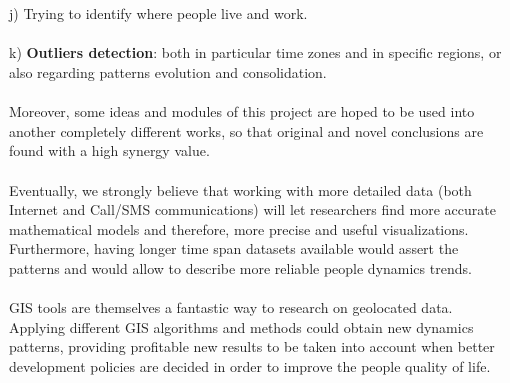 \\
\\
j) Trying to identify where people live and work.
\\
\\
k) {\bf Outliers detection}: both in particular time zones and in specific regions, or also regarding patterns evolution and consolidation.
\\
\\
Moreover, some ideas and modules of this project are hoped to be used into another completely different works, so that original and novel conclusions are found with a high synergy value.
\\
\\
Eventually, we strongly believe that working with more detailed data (both Internet and Call/SMS communications) will let researchers find more accurate mathematical models and therefore, more precise and useful visualizations. Furthermore, having longer time span datasets available would assert the patterns and would  allow to describe more reliable people dynamics trends.
\\
\\
GIS tools are themselves a fantastic way to research on geolocated data. Applying different GIS algorithms and methods could obtain new dynamics patterns, providing profitable new results to be taken into account when better development policies are decided in order to improve the people quality of life.